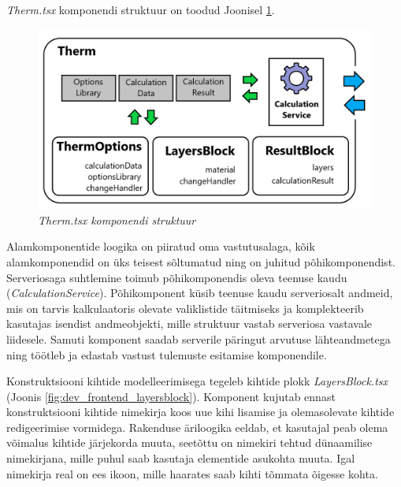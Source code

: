 \textit{Therm.tsx} komponendi struktuur on toodud Joonisel \ref{fig:development_frontend_therm}.
\begin{figure}[ht]
    \centering
    \includegraphics[width=1\textwidth]{figures/development/frontend_term_structure.png}
    \caption[Kasutajaliidese komponendi \textit{Therm.tsx} struktuur]{\textit{Therm.tsx komponendi struktuur}}
    \label{fig:development_frontend_therm}
\end{figure}

Alamkomponentide loogika on piiratud oma vastutusalaga, kõik alamkomponendid on üks teisest sõltumatud ning on juhitud põhikomponendist. Serveriosaga suhtlemine toimub põhikomponendis
oleva teenuse kaudu (\textit{CalculationService}). Põhikomponent küsib teenuse kaudu serveriosalt andmeid, mis on tarvis kalkulaatoris olevate valiklistide täitmiseks ja komplekteerib
kasutajas isendist andmeobjekti, mille struktuur vastab serveriosa vastavale liidesele. Samuti komponent saadab serverile päringut arvutuse lähteandmetega ning 
töötleb ja edastab vastust tulemuste esitamise komponendile.

Konstruktsiooni kihtide modelleerimisega tegeleb kihtide plokk \textit{LayersBlock.tsx} (Joonis \ref{fig:dev_frontend_layersblock}). Komponent kujutab ennast konstruktsiooni kihtide
nimekirja koos uue kihi lisamise ja olemasolevate kihtide redigeerimise vormidega. Rakenduse äriloogika eeldab, et kasutajal peab olema võimalus kihtide järjekorda muuta, seetõttu
on nimekiri tehtud dünaamilise nimekirjana, mille puhul saab kasutaja elementide asukohta muuta. Igal nimekirja real on ees ikoon, mille haarates saab kihti tõmmata õigesse kohta. 


